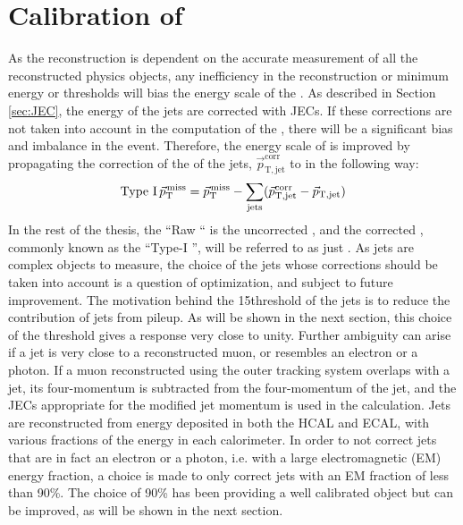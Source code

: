 \section{Calibration of \ptmiss} 
\noindent
\justify
\label{sec:metcorrections}
As the \ptmiss reconstruction is dependent on the accurate measurement of all the reconstructed physics objects, any inefficiency in the reconstruction or minimum energy or \pt thresholds will bias the energy scale of the \ptmiss. 
As described in Section \ref{sec:JEC}, the energy of the jets are corrected with JECs. 
If these corrections are not taken into account in the computation of the \ptmiss, there will be a significant bias and imbalance in the event. 
Therefore, the energy scale of \ptmiss is improved by propagating the correction of the \pt of the jets, $\vec{p}_\mathrm{T,jet}^\mathrm{corr}$ to \ptmiss in the following way:
\begin{equation}
\text{Type I} \, {\vec p}_{\mathrm{T}}^{\kern1pt\text{miss}}
={\vec p}_{\mathrm{T}}^{\kern1pt\text{miss}} - \sum_\mathrm{jets} (\vec{p}_\mathrm{T,jet}^\mathrm{corr}-\vec{p}_\mathrm{T,jet})
\label{eq:Type1MET}
\end{equation}                                                                          
In the rest of the thesis, the ``Raw \ptmiss`` is the uncorrected \ptmiss, and the corrected \ptmiss, commonly known as the ``Type-I \ptmiss'', will be referred to as just \ptmiss.
As jets are complex objects to measure, the choice of the jets whose corrections should be taken into account is a question of optimization, and subject to future improvement. 
The motivation behind the 15\GeV \pt threshold of the jets is to reduce the contribution of jets from pileup. 
As will be shown in the next section, this choice of the \pt threshold gives a response very close to unity. 
\newpara
\noindent\justify
Further ambiguity can arise if a jet is very close to a reconstructed muon, or resembles an electron or a photon. 
If a muon reconstructed using the outer tracking system overlaps with a jet, its four-momentum is subtracted from the four-momentum of the jet, and the JECs appropriate for the modified jet momentum is used in the \ptmiss calculation. 
Jets are reconstructed from energy deposited in both the HCAL and ECAL, with various fractions of the energy in each calorimeter. 
In order to not correct jets that are in fact an electron or a photon, i.e. with a large electromagnetic (EM) energy fraction, a choice is made to only correct jets with an EM fraction of less than 90\%. 
The choice of 90\% has been providing a well calibrated \ptmiss object but can be improved, as will be shown in the next section.  
